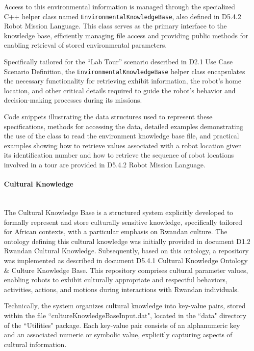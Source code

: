 \documentclass{CSSRforAfrica}
\begin{document}
Access to this environmental information is managed through the specialized C++ helper class named \texttt{\small EnvironmentalKnowledgeBase}, also defined in \textnormal{D5.4.2 Robot Mission Language}. This class serves as the primary interface to the knowledge base, efficiently managing file access and providing public methods for enabling retrieval of stored environmental parameters.

Specifically tailored for the \textnormal{``Lab Tour''} scenario described in \textnormal{D2.1 Use Case Scenario Definition}, the \texttt{\small EnvironmentalKnowledgeBase} helper class encapsulates the necessary functionality for retrieving exhibit information, the robot's home location, and other critical details required to guide the robot's behavior and decision-making processes during its missions.

Code snippets illustrating the data structures used to represent these specifications, methods for accessing the data, detailed examples demonstrating the use of the class to read the environment knowledge base file, and practical examples showing how to retrieve values associated with a robot location given its identification number and how to retrieve the sequence of robot locations involved in a tour are provided in \textnormal{D5.4.2 Robot Mission Language}.

\paragraph{Cultural Knowledge}\mbox{}\\

The Cultural Knowledge Base is a structured system explicitly developed to formally represent and store culturally sensitive knowledge, specifically tailored for African contexts, with a particular emphasis on Rwandan culture. The ontology defining this cultural knowledge was initially provided in document \textnormal{D1.2 Rwandan Cultural Knowledge}. Subsequently, based on this ontology, a repository was implemented as described in document \textnormal{D5.4.1 Cultural Knowledge Ontology \& Culture Knowledge Base}. This repository comprises cultural parameter values, enabling robots to exhibit culturally appropriate and respectful behaviors, activities, actions, and motions during interactions with Rwandan individuals.

Technically, the system organizes cultural knowledge into key-value pairs, stored within the file ``cultureKnowledgeBaseInput.dat", located in the ``data" directory of the ``Utilities" package. Each key-value pair consists of an alphanumeric key and an associated numeric or symbolic value, explicitly capturing aspects of cultural information.
\end{document}
